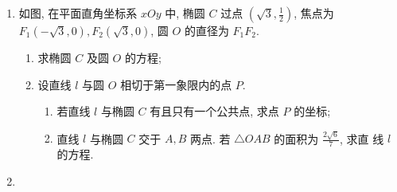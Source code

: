 \documentclass{l3doc}
\begin{document}
\begin{enumerate}[start = 18]
  \item 
    如图, 在平面直角坐标系 $x O y$ 中, 椭圆 $C$ 过点 $\left(\sqrt{3}, \frac{1}{2}\right)$, 焦点为 $F_{1}(-\sqrt{3}, 0), F_{2}(\sqrt{3}, 0)$, 圆 $O$ 的直径为 $F_{1} F_{2}$.
    \begin{enumerate}
      \item 求椭圆 $C$ 及圆 $O$ 的方程;
      \item 设直线 $l$ 与圆 $O$ 相切于第一象限内的点 $P$.
      \begin{enumerate}[]
          \item 若直线 $l$ 与椭圆 $C$ 有且只有一个公共点, 求点 $P$ 的坐标;
          \item
            直线 $l$ 与椭圆 $C$ 交于 $A, B$ 两点. 若 $\triangle O A B$ 的面积为 $\frac{2 \sqrt{6}}{7}$, 求直 线 $l$ 的方程.   
        \end{enumerate}
    \end{enumerate}
    
  \item {}
\end{enumerate}
\end{document}

